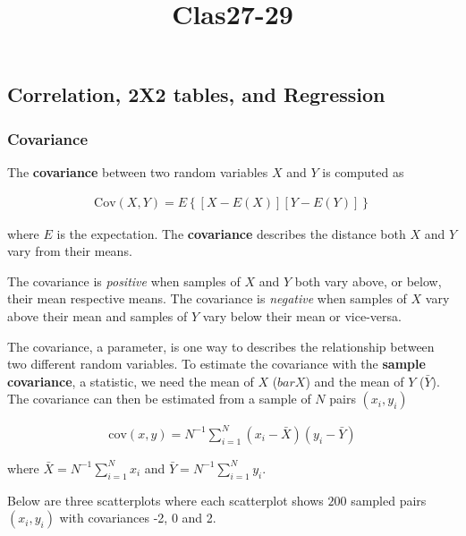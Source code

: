 \documentclass[11pt]{article}
\title{Clas27-29}
\begin{document}
    
    \maketitle
    
    

    
    \hypertarget{correlation-2x2-tables-and-regression}{%
\subsection{Correlation, 2X2 tables, and
Regression}\label{correlation-2x2-tables-and-regression}}

    \hypertarget{covariance}{%
\subsubsection{Covariance}\label{covariance}}

The \textbf{covariance} between two random variables \(X\) and \(Y\) is
computed as

\begin{align}
    \text{Cov}(X,Y) = E \left\{ \left[X-E(X) \right] \left[Y-E(Y) \right]  \right\}
\end{align}

where \(E\) is the expectation. The \textbf{covariance} describes the
distance both \(X\) and \(Y\) vary from their means.

The covariance is \emph{positive} when samples of \(X\) and \(Y\) both
vary above, or below, their mean respective means. The covariance is
\emph{negative} when samples of \(X\) vary above their mean and samples
of \(Y\) vary below their mean or vice-versa.

The covariance, a parameter, is one way to describes the relationship
between two different random variables. To estimate the covariance with
the \textbf{sample covariance}, a statistic, we need the mean of \(X\)
(\(bar{X}\)) and the mean of \(Y\) (\(\bar{Y}\)). The covariance can
then be estimated from a sample of \(N\) pairs \((x_{i},y_{i})\)

\begin{align}
    \text{cov}(x,y) = N^{-1}  \sum_{i=1}^{N} \left(x_{i}-\bar{X}\right) \left(y_{i}-\bar{Y}\right)
\end{align}

where \(\bar{X} = N^{-1} \sum_{i=1}^{N} x_{i}\) and
\(\bar{Y} = N^{-1} \sum_{i=1}^{N} y_{i}\).

Below are three scatterplots where each scatterplot shows \(200\)
sampled pairs \((x_{i}, y_{i})\) with covariances -2, 0 and 2.
\end{document}
